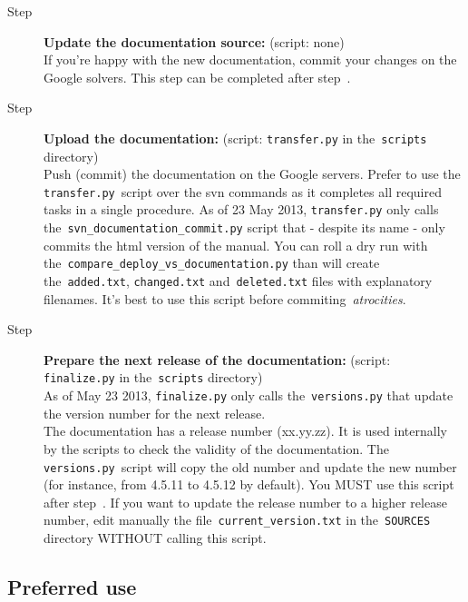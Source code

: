 \documentclass[a4paper,10pt]{article}
\newcommand{\code}[1]{\texttt{#1}}
\begin{document}
\begin{description}
 \item[Step ] {\bf Update the documentation source:} (script: none)\\If you're happy with the new documentation, commit your changes on the Google solvers. This step can be completed after step~.

 \item[Step ] {\bf Upload the documentation:} (script: \code{transfer.py} in the~\code{scripts} directory)\\Push (commit) the documentation on the Google servers. Prefer to use the \code{transfer.py}~script over the svn commands as it completes all required tasks in a single procedure. As of 23 May 2013, \code{transfer.py} only calls the~\code{svn\_documentation\_commit.py} script
that - despite its name - only commits the html version of the manual. You can roll a dry run with the~\code{compare\_deploy\_vs\_documentation.py} than will create the~\code{added.txt}, \code{changed.txt} and~\code{deleted.txt} files with explanatory filenames. It's best to use this script before commiting~\emph{atrocities}.

 \item[Step ] {\bf Prepare the next release of the documentation:} (script: \code{finalize.py} in the~\code{scripts} directory)\\As of May 23 2013, \code{finalize.py} only calls the~\code{versions.py} that update the version number for the next release.\\

The documentation has a release number (xx.yy.zz). It is used internally by the scripts to check the validity of the documentation. The \code{versions.py}~script will copy the old number and update the new number (for instance, from 4.5.11 to 4.5.12 by default). You MUST use this script after step~. If you want to update the release number to a higher release number, edit manually the file~\code{current\_version.txt} in the~\code{SOURCES} directory WITHOUT calling this script.
\end{description}

\subsection{Preferred use}
\end{document}
